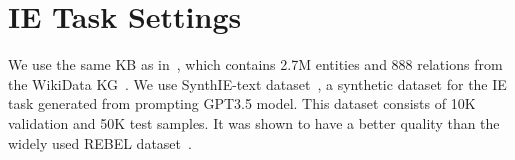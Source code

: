 \section{IE Task Settings}\label{app_sec:closed_information_extraction}
We use the same KB as in~\cite{josifoski2023exploiting}, which contains 2.7M entities and 888 relations from the WikiData KG~\cite{wikidata}.
We use SynthIE-text dataset~\cite{josifoski2023exploiting}, a synthetic dataset for the IE task generated from prompting GPT3.5 model.
This dataset consists of 10K validation and 50K test samples.
It was shown to have a better quality than the widely used REBEL dataset~\cite{huguet-cabot-navigli-2021-rebel-relation}.


%
